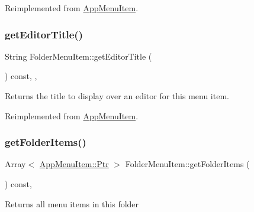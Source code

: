 Reimplemented from \mbox{\hyperlink{classAppMenuItem_af742017ff127e5f36da1e206205c86ee}{App\+Menu\+Item}}.

\mbox{\label{classFolderMenuItem_a0cd063b5b374a47a0913ff11c4c1a905}} 
\subsubsection{\texorpdfstring{get\+Editor\+Title()}{getEditorTitle()}}
{\footnotesize\ttfamily String Folder\+Menu\+Item\+::get\+Editor\+Title (\begin{DoxyParamCaption}{ }\end{DoxyParamCaption}) const\hspace{0.3cm}{\ttfamily [override]}, {\ttfamily [protected]}, {\ttfamily [virtual]}}

\begin{DoxyReturn}{Returns}
the title to display over an editor for this menu item. 
\end{DoxyReturn}


Reimplemented from \mbox{\hyperlink{classAppMenuItem_a4f0501780311afb7630d99b9e84a5c9d}{App\+Menu\+Item}}.

\mbox{\label{classFolderMenuItem_af3b9473a335da9e3cb6ceccbb78c3ea6}} 
\subsubsection{\texorpdfstring{get\+Folder\+Items()}{getFolderItems()}}
{\footnotesize\ttfamily Array$<$ \mbox{\hyperlink{classAppMenuItem_ab5f51c5d74f8df62b8862c0cc8126cb7}{App\+Menu\+Item\+::\+Ptr}} $>$ Folder\+Menu\+Item\+::get\+Folder\+Items (\begin{DoxyParamCaption}{ }\end{DoxyParamCaption}) const\hspace{0.3cm}{\ttfamily [override]}, {\ttfamily [virtual]}}

\begin{DoxyReturn}{Returns}
all menu items in this folder 
\end{DoxyReturn}


